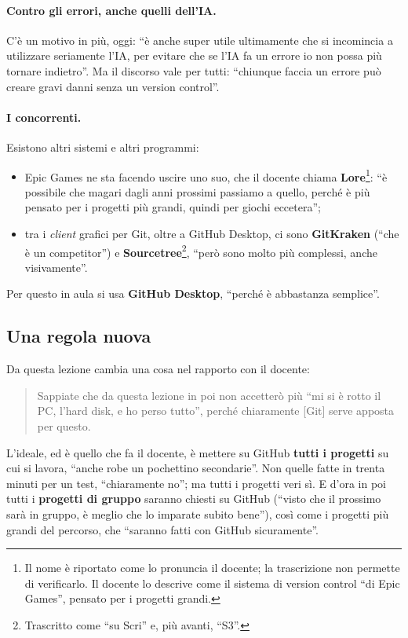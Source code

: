 \paragraph{Contro gli errori, anche quelli dell'IA.} C'è un motivo in più, oggi:
``è anche super utile ultimamente che si incomincia a utilizzare seriamente
l'IA, per evitare che se l'IA fa un errore io non possa più tornare indietro''.
Ma il discorso vale per tutti: ``chiunque faccia un errore può creare gravi
danni senza un version control''.

\paragraph{I concorrenti.} Esistono altri sistemi e altri programmi:
\begin{itemize}
  \item Epic Games ne sta facendo uscire uno suo, che il docente chiama
        \textbf{Lore}\footnote{Il nome è riportato come lo pronuncia il
        docente; la trascrizione non permette di verificarlo. Il docente lo
        descrive come il sistema di version control ``di Epic Games'', pensato
        per i progetti grandi.}: ``è possibile che magari dagli anni prossimi
        passiamo a quello, perché è più pensato per i progetti più grandi,
        quindi per giochi eccetera'';
  \item tra i \emph{client} grafici per Git, oltre a GitHub Desktop, ci sono
        \textbf{GitKraken} (``che è un competitor'') e
        \textbf{Sourcetree}\footnote{Trascritto come ``su Scri'' e, più avanti,
        ``S3''.}, ``però sono molto più complessi, anche visivamente''.
\end{itemize}
Per questo in aula si usa \textbf{GitHub Desktop}, ``perché è abbastanza
semplice''.

\subsection{Una regola nuova}

Da questa lezione cambia una cosa nel rapporto con il docente:
\begin{quote}
Sappiate che da questa lezione in poi non accetterò più ``mi si è rotto il PC,
l'hard disk, e ho perso tutto'', perché chiaramente [Git] serve apposta per
questo.
\end{quote}
L'ideale, ed è quello che fa il docente, è mettere su GitHub \textbf{tutti i
progetti} su cui si lavora, ``anche robe un pochettino secondarie''. Non quelle
fatte in trenta minuti per un test, ``chiaramente no''; ma tutti i progetti veri
sì. E d'ora in poi tutti i \textbf{progetti di gruppo} saranno chiesti su GitHub
(``visto che il prossimo sarà in gruppo, è meglio che lo imparate subito
bene''), così come i progetti più grandi del percorso, che ``saranno fatti con
GitHub sicuramente''.

